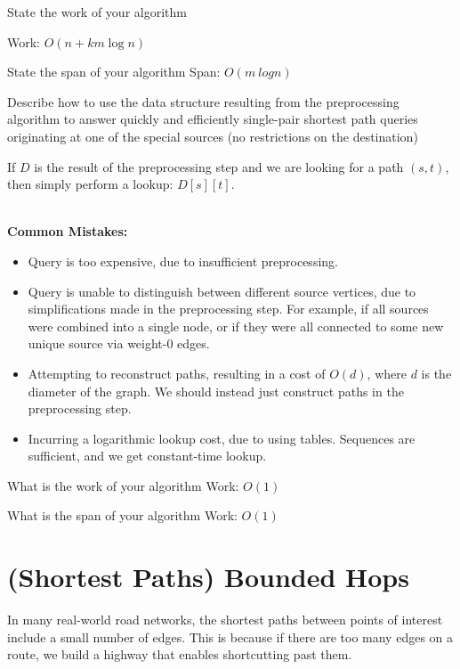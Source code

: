 \begin{problem}
\ask[2]
State the work of your algorithm

\sol Work: $O(n + km\log n)$

\ask[2]
State the span of your algorithm
\sol Span: $O(m\ log n)$

\ask[5]
Describe how to use the data structure resulting from the
preprocessing algorithm to answer quickly and efficiently single-pair
shortest path queries originating at one of the special sources (no
restrictions on the destination)

\sol
If $D$ is the result of the preprocessing step and we are looking for a path
$(s, t)$, then simply perform a lookup: $D[s][t]$.
~~~~~~~~~~~~~~~~~~~~~~~~~~~~~~~~~~~~~~~~~~~~~~~~~

\notes
\textbf{Common Mistakes:}
\begin{itemize}
	\item Query is too expensive, due to insufficient preprocessing.
	\item Query is unable to distinguish between different source vertices, due
  to simplifications made in the preprocessing step. For example, if all
  sources were combined into a single node, or if they were all connected to
  some new unique source via weight-0 edges.
	\item Attempting to reconstruct paths, resulting in a cost of $O(d)$, where
  $d$ is the diameter of the graph. We should instead just construct paths in
  the preprocessing step.
	\item Incurring a logarithmic lookup cost, due to using tables. Sequences are
  sufficient, and we get constant-time lookup.
\end{itemize}


\ask What is the work of your algorithm Work: 
\sol $O(1)$

\ask What is the span of your algorithm Work:
\sol $O(1)$


\end{problem}





\section{(Shortest Paths) Bounded Hops}

In many real-world road networks, the shortest paths between points of
interest include a small number of edges.  This is because if there
are too many edges on a route, we build a highway that enables
shortcutting past them.  

